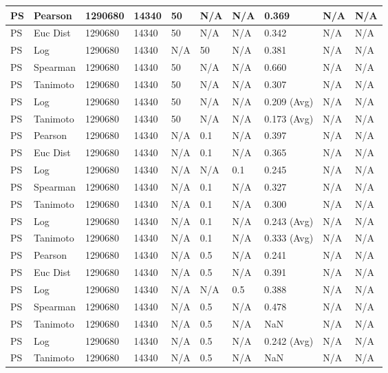\documentclass{article}
\begin{document}
\begin{longtable}{ |p{1.7cm}|p{1.9cm}|p{1.5cm}|p{1.5cm}|p{0.75cm}|p{0.75cm}|p{0.75cm}|p{0.75cm}|p{1.5cm}|p{1.5cm}|}
    PS & Pearson & 1290680 & 14340 & 50 & N/A & N/A & 0.369 & N/A & N/A  \\ \hline
    PS & Euc Dist & 1290680 & 14340 & 50 & N/A & N/A & 0.342 & N/A & N/A   \\ \hline
    PS & Log & 1290680 & 14340 & N/A &  50 & N/A& 0.381 & N/A & N/A  \\ \hline
    PS & Spearman & 1290680 & 14340 & 50 & N/A & N/A & 0.660 & N/A & N/A \\ \hline
    PS & Tanimoto & 1290680 & 14340 & 50 & N/A& N/A & 0.307 & N/A & N/A \\ \hline
    PS  & Log & 1290680 & 14340 & 50 & N/A& N/A & 0.209 (Avg) & N/A & N/A \\ \hline
    PS & Tanimoto & 1290680 & 14340 & 50 & N/A & N/A & 0.173 (Avg) & N/A & N/A \\ \hline
    
    PS & Pearson & 1290680 & 14340 & N/A & 0.1 & N/A & 0.397 & N/A & N/A  \\ \hline
    PS & Euc Dist & 1290680 & 14340 & N/A & 0.1 & N/A & 0.365 & N/A & N/A   \\ \hline
    PS & Log & 1290680 & 14340 & N/A &  N/A & 0.1 & 0.245 & N/A & N/A  \\ \hline
    PS  & Spearman & 1290680 & 14340 & N/A & 0.1 & N/A & 0.327 & N/A & N/A \\ \hline
    PS  & Tanimoto & 1290680 & 14340 & N/A & 0.1 & N/A & 0.300 & N/A & N/A \\ \hline
    PS  & Log & 1290680 & 14340 & N/A & 0.1 & N/A & 0.243 (Avg) & N/A & N/A \\ \hline
    PS  & Tanimoto & 1290680 & 14340 & N/A & 0.1 & N/A & 0.333 (Avg) & N/A & N/A \\ \hline
    
    PS & Pearson & 1290680 & 14340 & N/A & 0.5 & N/A & 0.241 & N/A & N/A  \\ \hline
    PS & Euc Dist & 1290680 & 14340 & N/A & 0.5 & N/A & 0.391 & N/A & N/A   \\ \hline
    PS & Log & 1290680 & 14340 & N/A &  N/A & 0.5 & 0.388 & N/A & N/A  \\ \hline
    PS & Spearman & 1290680 & 14340 & N/A & 0.5 & N/A & 0.478 & N/A & N/A \\ \hline
    PS & Tanimoto & 1290680 & 14340 & N/A & 0.5 & N/A & NaN & N/A & N/A \\ \hline
    PS & Log & 1290680 & 14340 & N/A & 0.5 & N/A & 0.242 (Avg) & N/A & N/A \\ \hline
    PS & Tanimoto & 1290680 & 14340 & N/A & 0.5 & N/A & NaN & N/A & N/A \\ \hline
    

\end{longtable}
\end{document}
